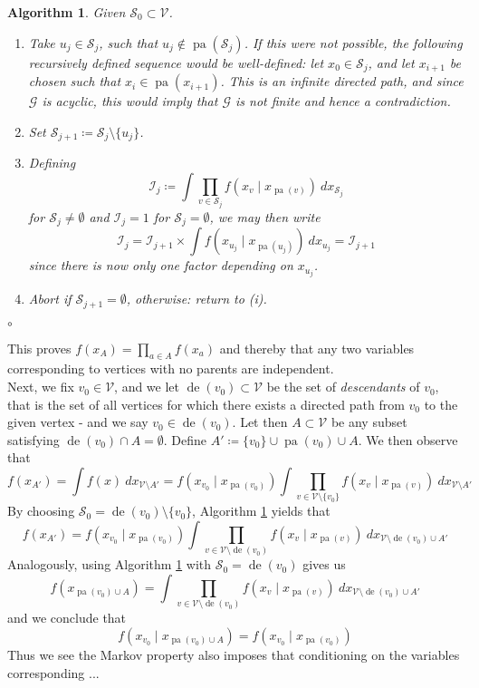 \documentclass[11pt, a4paper]{memoir}
\theoremstyle{break}
\theoremstyle{break}
\newtheorem{inneralg}{Algorithm}
\newenvironment{alg}{\begin{inneralg}}{\ensuremath{\circ}\end{inneralg}}
\theoremstyle{nonumberplain}
\DeclareMathOperator{\pa}{pa}
\DeclareMathOperator{\de}{de}
\begin{document}
\begin{alg}\label{alg1}
Given $\mathcal{S}_0\subset \mathcal{V}$.
\begin{enumerate}[label=(\roman*)]
	\item Take $u_j\in \mathcal{S}_j$, such that $u_j\not\in \pa\left(\mathcal{S}_j\right)$. If this were not possible, the following recursively defined sequence would be well-defined: let $x_0\in \mathcal{S}_j$, and let $x_{i+1}$ be chosen such that $x_i\in \pa(x_{i+1})$. This is an infinite directed path, and since $\mathcal{G}$ is acyclic, this would imply that $\mathcal{G}$ is not finite and hence a contradiction.
	\item Set $\mathcal{S}_{j+1}\coloneqq\mathcal{S}_j\setminus \{u_j\}$.  
	\item Defining
$$\mathcal{I}_{j}\coloneqq \int\prod_{v\in \mathcal{S}_j} f\left(x_v\mid x_{\pa(v)}\right)\ dx_{\mathcal{S}_j}$$
for $ \mathcal{S}_j\neq \emptyset$ and $\mathcal{I}_j=1$ for $\mathcal{S}_j= \emptyset$, we may then write
	$$\mathcal{I}_{j}=\mathcal{I}_{j+1}\times \int f\left(x_{u_j}\mid x_{\pa(u_j)}\right)\ dx_{u_j}=\mathcal{I}_{j+1}$$
	since there is now only one factor depending on $x_{u_j}$.
	\item Abort if $\mathcal{S}_{j+1}=\emptyset$, otherwise: return to (i).
\end{enumerate}
\end{alg}
This proves $f(x_A)=\prod_{a\in A}f(x_a)$ and thereby that any two variables corresponding to vertices with no parents are independent.\\[5pt]
Next, we fix $v_0\in \mathcal{V}$, and we let $\de(v_0)\subset \mathcal{V}$ be the set of \emph{descendants} of $v_0$, that is the set of all vertices for which there exists a directed path from $v_0$ to the given vertex - and we say $v_0\in \de(v_0)$. Let then $A\subset \mathcal{V}$ be any subset satisfying $\de(v_0)\cap A=\emptyset$. Define $A'\coloneqq \{v_0\}\cup\pa(v_0)\cup A$. We then observe that
$$f\left(x_{A'}\right)=\int f(x)\ dx_{\mathcal{V}\setminus A'}=f\left(x_{v_0}\mid x_{\pa(v_0)}\right)\int \prod_{v\in \mathcal{V}\setminus\{v_0\}} f\left(x_v\mid x_{\pa(v)}\right)\ dx_{\mathcal{V}\setminus A'}$$
By choosing $\mathcal{S}_0=\de(v_0)\setminus\{v_0\}$, Algorithm \ref{alg1} yields that
$$f(x_{A'})=f\left(x_{v_0}\mid x_{\pa(v_0)}\right)\int \prod_{v\in \mathcal{V}\setminus\de(v_0)} f\left(x_v\mid x_{\pa(v)}\right)\ dx_{\mathcal{V}\setminus \de(v_0)\cup A'}$$
Analogously, using Algorithm \ref{alg1} with $\mathcal{S}_0=\de(v_0)$ gives us
$$
f(x_{\pa(v_0)\cup A})=\int \prod_{v\in \mathcal{V}\setminus\de(v_0)} f\left(x_v\mid x_{\pa(v)}\right)\ dx_{\mathcal{V}\setminus \de(v_0)\cup A'}
$$
and we conclude that
$$f\left(x_{v_0}\mid x_{\pa(v_0)\cup A}\right)=f\left(x_{v_0}\mid x_{\pa(v_0)}\right)$$
Thus we see the Markov property also imposes that conditioning on the variables corresponding ...\\[5pt]
 
\end{document}
